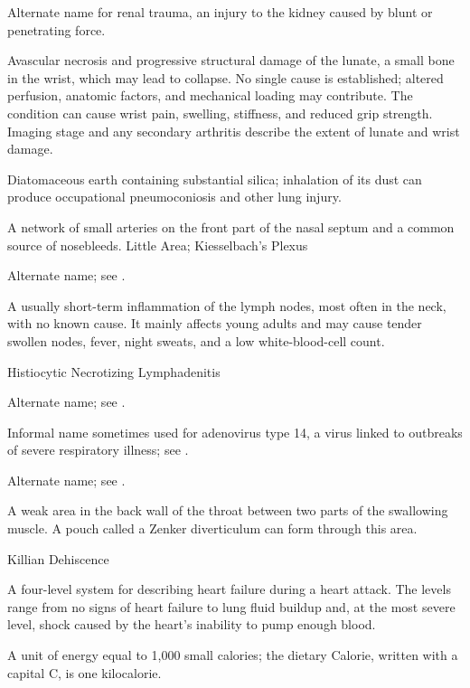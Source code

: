  Alternate name for renal trauma, an injury to the kidney caused by blunt or penetrating force.

 Avascular necrosis and progressive structural damage of the lunate,
a small bone in the wrist, which may lead to collapse. No single cause is established; altered
perfusion, anatomic factors, and mechanical loading may contribute. The condition can cause
wrist pain, swelling, stiffness, and reduced grip strength. Imaging stage and any secondary
arthritis describe the extent of lunate and wrist damage.

 Diatomaceous earth containing substantial silica; inhalation of its dust can produce occupational pneumoconiosis and other lung injury.

 A network of small arteries on the front part of the nasal septum and a common source of nosebleeds.
\synonyms
Little Area; Kiesselbach's Plexus

 Alternate name; see .

 A usually short-term inflammation of the lymph nodes, most often in the neck, with no known cause. It mainly affects young adults and may cause tender swollen nodes, fever, night sweats, and a low white-blood-cell count.

\synonyms
Histiocytic Necrotizing Lymphadenitis

 Alternate name; see .

 Informal name sometimes used for adenovirus type 14, a virus linked to outbreaks of severe respiratory illness; see .

 Alternate name; see .

 A weak area in the back wall of the throat between two parts of the swallowing muscle. A pouch called a Zenker diverticulum can form through this area.

\synonyms
Killian Dehiscence

 A four-level system for describing heart failure during a heart attack. The levels range from no signs of heart failure to lung fluid buildup and, at the most severe level, shock caused by the heart’s inability to pump enough blood.

 A unit of energy equal to 1,000 small calories; the dietary Calorie, written with a capital C, is one kilocalorie.

